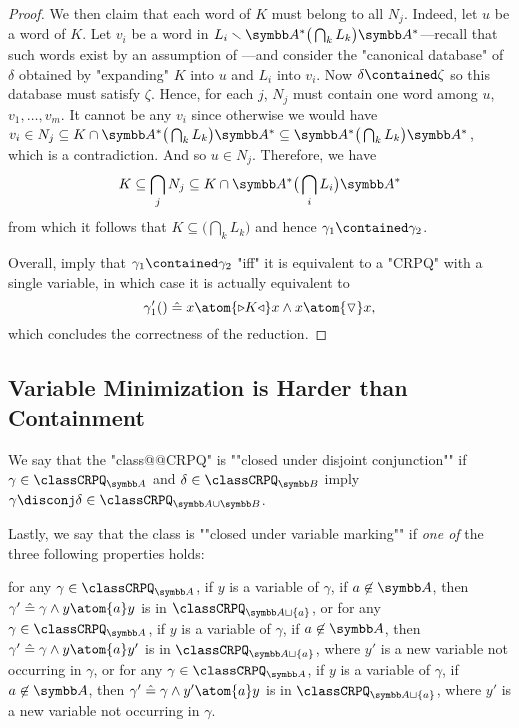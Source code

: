 \begin{proof}
	We then claim that each word of $K$ must belong to all $N_j$.
	Indeed, let $u$ be a word of $K$. Let $v_i$ be a word in
	$L_i \smallsetminus \A^* \big(\bigcap_k L_k\big) \A^*$---recall
	that such words exist by an assumption of ---and
	consider the "canonical database" of $\delta$ obtained by "expanding"
	$K$ into $u$ and $L_i$ into $v_i$.
	Now $\delta \contained \zeta$ so this database must satisfy $\zeta$.
	Hence, for each $j$, $N_j$ must contain one word among $u$, $v_1, \dotsc,v_m$.
	It cannot be any $v_i$ since otherwise we would have $v_i \in N_j \subseteq
	K \cap \A^* \big(\bigcap_k L_k\big) \A^* \subseteq \A^* \big(\bigcap_k L_k\big) \A^*$, which is a contradiction. And so $u \in N_j$.
	Therefore, we have
	\[
		K \subseteq \bigcap_j N_j \subseteq K \cap \A^* \big(\bigcap_i L_i\big) \A^*
	\]
	from which it follows that $K \subseteq \big(\bigcap_k L_k\big)$ and hence
	$\gamma_1 \contained \gamma_2$.
	
	Overall,
	imply that $\gamma_1 \contained \gamma_2$ "iff" it is equivalent
	to a "CRPQ" with a single variable, in which case it is actually equivalent to
	\[\gamma'_1() \defeq x \atom{\triangleright K \triangleleft} x
		\land x \atom{\marking} x,\]
	which concludes the correctness of the reduction.
\end{proof}

\subsection{Variable Minimization is Harder than Containment}

We say that the "class@@CRPQ" is \AP""closed under disjoint conjunction""
if $\gamma \in \classCRPQ_{\A}$ and $\delta \in \classCRPQ_{\B}$
imply $\gamma \disconj \delta \in \classCRPQ_{\A \cup \B}$.

Lastly, we say that the class is \AP""closed under variable marking""
if \emph{one of} the three following properties holds: 
\begin{description}
	\itemAP[\intro*\axiomVarMarkingLoop] for any $\gamma \in \classCRPQ_{\A}$, if $y$ is a variable of $\gamma$,
		if $a\not\in\A$, then $\gamma' \defeq \gamma \land y \atom{a} y$
		is in $\classCRPQ_{\A\sqcup\{a\}}$, or
	\itemAP[\intro*\axiomVarMarkingOut] for any $\gamma \in \classCRPQ_{\A}$, if $y$ is a variable of $\gamma$,	
		if $a\not\in\A$, then $\gamma' \defeq \gamma \land y \atom{a} y'$
		is in $\classCRPQ_{\A\sqcup\{a\}}$,
		where $y'$ is a new variable not occurring in $\gamma$, or
	\itemAP[\intro*\axiomVarMarkingIn] for any $\gamma \in \classCRPQ_{\A}$, if $y$ is a variable of $\gamma$,	
		if $a\not\in\A$, then $\gamma' \defeq \gamma \land y' \atom{a} y$
		is in $\classCRPQ_{\A\sqcup\{a\}}$,
		where $y'$ is a new variable not occurring in $\gamma$.
\end{description}

